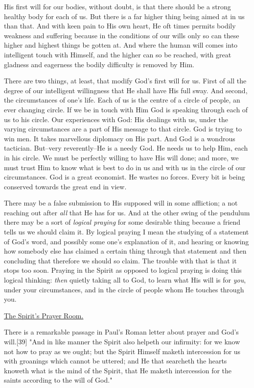 His first will for our bodies, without doubt, is that there should be a
strong healthy body for each of us. But there is a far higher thing being
aimed at in us than that. And with keen pain to His own heart, He oft
times permits bodily weakness and suffering because in the conditions of
our wills only so can these higher and highest things be gotten at. And
where the human will comes into intelligent touch with Himself, and the
higher can so be reached, with great gladness and eagerness the bodily
difficulty is removed by Him.

There are two things, at least, that modify God's first will for us. First
of all the degree of our intelligent willingness that He shall have His
full sway. And second, the circumstances of one's life. Each of us is the
centre of a circle of people, an ever changing circle. If we be in touch
with Him God is speaking through each of us to his circle. Our experiences
with God: His dealings with us, under the varying circumstances are a part
of His message to that circle. God is trying to win men. It takes
marvellous diplomacy on His part. And God is a wondrous tactician.
But--very reverently--He is a needy God. He needs us to help Him, each in
his circle. We must be perfectly willing to have His will done; and more,
we must trust Him to know what is best to do in us and with us in the
circle of our circumstances. God is a great economist. He wastes no
forces. Every bit is being conserved towards the great end in view.

There may be a false submission to His supposed will in some affliction; a
not reaching out after \textit{all} that He has for us. And at the other swing of
the pendulum there may be a sort of \textit{logical praying} for some desirable
thing because a friend tells us we should claim it. By logical praying I
mean the studying of a statement of God's word, and possibly some one's
explanation of it, and hearing or knowing how somebody else has claimed a
certain thing through that statement and then concluding that therefore we
should so claim. The trouble with that is that it stops too soon. Praying
in the Spirit as opposed to logical praying is doing this logical
thinking: \textit{then} quietly taking all to God, to learn what His will is for
\textit{you}, under your circumstances, and in the circle of people whom He
touches through you.



\underline{The Spirit's Prayer Room.}


There is a remarkable passage in Paul's Roman letter about prayer and
God's will.[39] "And in like manner the Spirit also helpeth our infirmity:
for we know not how to pray as we ought; but the Spirit Himself maketh
intercession for us with groanings which cannot be uttered; and He that
searcheth the hearts knoweth what is the mind of the Spirit, that He
maketh intercession for the saints according to the will of God."

